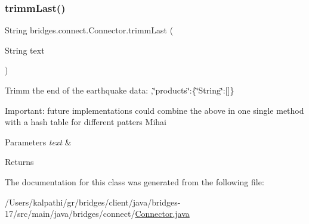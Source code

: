 \subsubsection{\texorpdfstring{trimm\+Last()}{trimmLast()}}
{\footnotesize\ttfamily String bridges.\+connect.\+Connector.\+trimm\+Last (\begin{DoxyParamCaption}\item[{String}]{text }\end{DoxyParamCaption})}

Trimm the end of the earthquake data\+: ,\char`\"{}products\char`\"{}\+:\{\char`\"{}\+String\char`\"{}\+:\mbox{[}\mbox{]}\}

Important\+: future implementations could combine the above in one single method with a hash table for different patters Mihai 
\begin{DoxyParams}{Parameters}
{\em text} & \\
\hline
\end{DoxyParams}
\begin{DoxyReturn}{Returns}

\end{DoxyReturn}


The documentation for this class was generated from the following file\+:\begin{DoxyCompactItemize}
\item 
/\+Users/kalpathi/gr/bridges/client/java/bridges-\/17/src/main/java/bridges/connect/\mbox{\hyperlink{_connector_8java}{Connector.\+java}}\end{DoxyCompactItemize}
